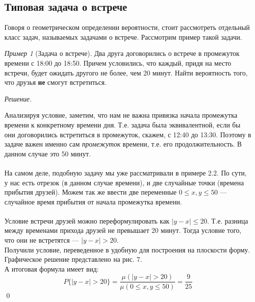 \documentclass[12pt,a4paper]{article}
\theoremstyle{definition}
\theoremstyle{definition}
\theoremstyle{remark}
\theoremstyle{corollary}
\theoremstyle{bolditalic}
\newtheorem{example}{Пример}[section]
\newenvironment{solution}{
    \vspace{0.5em}
    \noindent\textit{Решение.}
}{\qed\vspace{1em}}
\begin{document}
\subsection{Типовая задача о встрече}

Говоря о геометрическом определении вероятности, стоит рассмотреть отдельный класс задач, называемых задачами о встрече. Рассмотрим пример такой задачи.

\begin{example}[Задача о встрече]
    Два друга договорились о встрече в промежуток времени с 18:00 до 18:50. Причем условились, что каждый, придя на место встречи, будет ожидать другого не более, чем 20 минут. Найти вероятность того, что друзья \textbf{не} смогут встретиться.
\end{example}

\begin{solution}
    Анализируя условие, заметим, что нам не важна привязка начала промежутка времени к конкретному времени дня. Т.е. задача была эквивалентной, если бы они договорились встретиться в промежуток, скажем, с 12:40 до 13:30. Поэтому в задаче важен именно сам \textit{промежуток} времени, т.е. его продолжительность. В данном случае это 50 минут.\\\\
    На самом деле, подобную задачу мы уже рассматривали в примере 2.2. По сути, у нас есть отрезок (в данном случае времени), и две случайные точки (времена прибытия друзей). Можем так же ввести две переменные $0\le x, y \le 50$ --- случайное время прибытия от начала промежутка времени.\\\\
    Условие встречи друзей можно переформулировать как $|y-x| \le 20$. Т.е. разница между временами прихода друзей не превышает 20 минут. Тогда условие того, что они не встретятся --- $|y-x| > 20$.\\
    Получили условие, переведенное в удобную для построения на плоскости форму. Графическое решение представлено на рис. 7.\\
    А итоговая формула имеет вид:
    \[
    P\{|y-x|>20\} = \frac{\mu(|y-x|>20)}{\mu(0 \le x, y \le 50)} = \frac{9}{25}
    \]
\end{solution}
\end{document}
